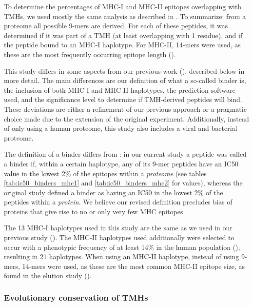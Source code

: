 To determine the percentages of MHC-I and MHC-II epitopes overlapping
with TMHs, we used mostly the same analysis as described in \cite{bianchi2017}.
To summarize: from a proteome all possible 9-mers are derived. For each
of these peptides, it was determined if it was part of a 
TMH (at least overlapping with 1 residue), 
and if the peptide bound to an MHC-I haplotype.
For MHC-II, 14-mers were used, as these are the most frequently occurring
epitope length (\cite{bergseng2015different}).

This study differs in some aspects from our previous work (\cite{bianchi2017}), 
described below in more detail.
The main differences are our definition of what a so-called binder is, 
the inclusion of both MHC-I and MHC-II haplotypes, 
the prediction software used, 
and the significance level to determine if TMH-derived peptides will bind.
These deviations are either a refinement of our previous approach or
a pragmatic choice made due to the extension of the original experiment.
Additionally, instead of only using a human proteome, this study
also includes a viral and bacterial proteome.

The definition of a binder differs from \cite{bianchi2017}:
in our current study a peptide was called a binder if, within a certain haplotype, 
any of its 9-mer peptides have an IC50 value in the lowest 2\% of 
the epitopes within a 
\emph{proteome} (see tables \ref{tab:ic50_binders_mhc1} and \ref{tab:ic50_binders_mhc2}
for values), whereas the original study defined
a binder as having an IC50 in the lowest 2\% 
of the peptides within a \emph{protein}.
We believe our revised definition precludes bias of proteins 
that give rise to no or only very few MHC epitopes

The 13 MHC-I haplotypes used in this study are the same as 
we used in our previous study (\cite{bianchi2017}).
The MHC-II haplotypes used additionally were selected 
to occur with a phenotypic frequency of at least 14\% in
the human population (\cite{greenbaum2011functional}),
resulting in 21 haplotypes.
When using an MHC-II haplotype, instead of using 9-mers, 14-mers were
used, as these are the most common MHC-II epitope size,
as found in the elution study (\cite{bergseng2015different}).

\subsubsection{Evolutionary conservation of TMHs}

